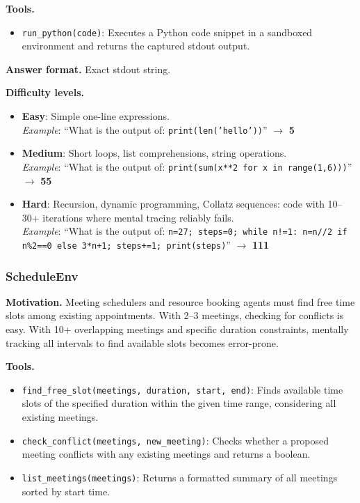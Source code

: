 \textbf{Tools.}
\begin{itemize}
    \item \texttt{run\_python(code)}: Executes a Python code snippet in a sandboxed environment and returns the captured stdout output.
\end{itemize}

\textbf{Answer format.} Exact stdout string.

\textbf{Difficulty levels.}
\begin{itemize}
    \item \textbf{Easy}: Simple one-line expressions.\\
    \emph{Example}: ``What is the output of: \texttt{print(len('hello'))}'' $\to$ \textbf{5}
    \item \textbf{Medium}: Short loops, list comprehensions, string operations.\\
    \emph{Example}: ``What is the output of: \texttt{print(sum(x**2 for x in range(1,6)))}'' $\to$ \textbf{55}
    \item \textbf{Hard}: Recursion, dynamic programming, Collatz sequences: code with 10--30+ iterations where mental tracing reliably fails.\\
    \emph{Example}: ``What is the output of: \texttt{n=27; steps=0; while n!=1: n=n//2 if n\%2==0 else 3*n+1; steps+=1; print(steps)}'' $\to$ \textbf{111}
\end{itemize}

\subsubsection{ScheduleEnv}

\textbf{Motivation.}
Meeting schedulers and resource booking agents must find free time slots among existing appointments. With 2--3 meetings, checking for conflicts is easy. With 10+ overlapping meetings and specific duration constraints, mentally tracking all intervals to find available slots becomes error-prone.

\textbf{Tools.}
\begin{itemize}
    \item \texttt{find\_free\_slot(meetings, duration, start, end)}: Finds available time slots of the specified duration within the given time range, considering all existing meetings.
    \item \texttt{check\_conflict(meetings, new\_meeting)}: Checks whether a proposed meeting conflicts with any existing meetings and returns a boolean.
    \item \texttt{list\_meetings(meetings)}: Returns a formatted summary of all meetings sorted by start time.
\end{itemize}

